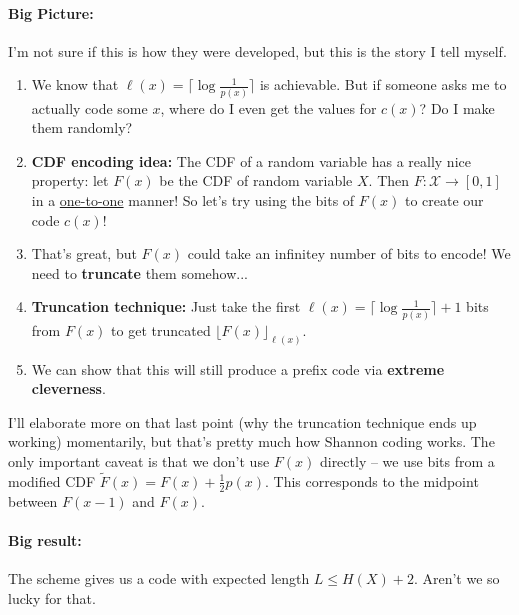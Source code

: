 \documentclass[a4paper,12pt]{report}
\begin{document}
\paragraph{Big Picture: } I'm not sure if this is how they were developed, but
this is the story I tell myself.
\begin{enumerate}
\item We know that $\ell(x) = \lceil \log \frac 1 {p(x)} \rceil$ is achievable.
But if someone asks me to actually code some $x$, where do I even get the values
for $c(x)$? Do I make them randomly? 
\item \textbf{CDF encoding idea:} The CDF of a random variable has a really nice
property: let $F(x)$ be the CDF of random variable $X$. Then $F:\mathcal X \to
[0,1]$ in a \underline{one-to-one} manner! So let's try using the bits of
$F(x)$ to create our code $c(x)$!
\item That's great, but $F(x)$ could take an infinitey number of bits to encode!
We need to \textbf{truncate} them somehow... 
\item \textbf{Truncation technique:} Just take the first $\ell(x) = \lceil\log
\frac 1 {p(x)} \rceil + 1$ bits from $F(x)$ to get truncated $\lfloor
F(x)\rfloor_{\ell(x)}$.
\item We can show that this will still produce a prefix code via \textbf{extreme
cleverness}.
\end{enumerate}


I'll elaborate more on that last point (why the truncation technique ends up
working) momentarily, but that's pretty much how Shannon coding works. The only
important caveat is that we don't use $F(x)$ directly -- we use bits from a
modified CDF $\tilde F(x) = F(x) + \frac 1 2 p(x)$. This corresponds to the
midpoint between $F(x-1)$ and $F(x)$.

\paragraph{Big result: } The scheme gives us a code with expected length $L \leq
H(X) + 2$. Aren't we so lucky for that.
\end{document}
